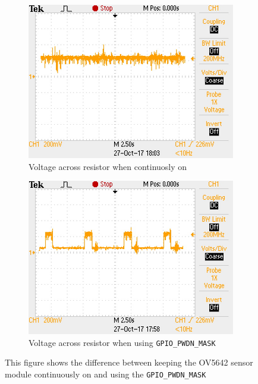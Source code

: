    \begin{figure}[ht]
    \centering
    \begin{subfigure}{\textwidth}
    \centering
        \includegraphics[width=0.75\linewidth]{pics/power_1.JPG}
        \caption{Voltage across  resistor when continuosly on}
    \end{subfigure}%
   
    \begin{subfigure}{\textwidth}
    \centering
        \includegraphics[width=0.75\linewidth]{pics/power_2.JPG}
        \caption{Voltage across  resistor when  using \texttt{GPIO\_PWDN\_MASK}}
    \end{subfigure}
       \caption{This figure shows the difference between keeping the OV5642 sensor module continuously on and using the \texttt{GPIO\_PWDN\_MASK}}
        \label{fig:power}
   \end{figure}

